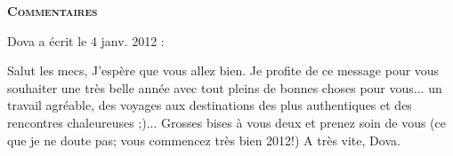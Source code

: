 \bigskip
\textbf{\textsc{Commentaires}}

\medskip
Dova a écrit le 4 janv. 2012 :
\begin{displayquote}
Salut les mecs,
J'espère que vous allez bien.
Je profite de ce message pour vous souhaiter une très belle année avec tout pleins de bonnes choses pour vous... un travail agréable, des voyages aux destinations des plus authentiques et des rencontres chaleureuses ;)...
Grosses bises à vous deux et prenez soin de vous (ce que je ne doute pas; vous commencez très bien 2012!)
A très vite,
Dova.
\end{displayquote}

\vfill
